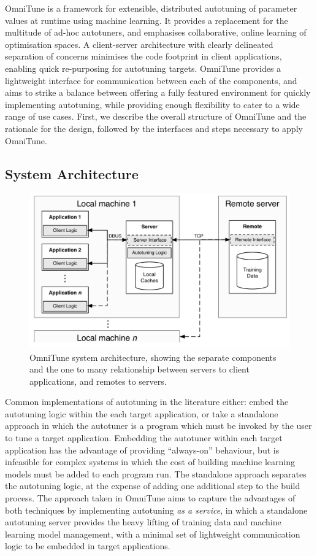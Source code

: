 \documentclass[nonatbib,preprint,9pt]{sigplanconf}
\begin{document}
OmniTune is a framework for extensible, distributed autotuning of
parameter values at runtime using machine learning. It provides a
replacement for the multitude of ad-hoc autotuners, and emphasises
collaborative, online learning of optimisation spaces. A client-server
architecture with clearly delineated separation of concerns minimises
the code footprint in client applications, enabling quick re-purposing
for autotuning targets. OmniTune provides a lightweight interface for
communication between each of the components, and aims to strike a
balance between offering a fully featured environment for quickly
implementing autotuning, while providing enough flexibility to cater
to a wide range of use cases. First, we describe the overall structure
of OmniTune and the rationale for the design, followed by the
interfaces and steps necessary to apply OmniTune.


\subsection{System Architecture}

\begin{figure}
\centering
\includegraphics[width=.98\columnwidth]{img/omnitune-system-overview.pdf}
\caption[OmniTune system diagram]{%
  OmniTune system architecture, showing the separate components and
  the one to many relationship between servers to client applications,
  and remotes to servers.%
}
\label{fig:omnitune-system-overview}
\end{figure}

Common implementations of autotuning in the literature either: embed
the autotuning logic within the each target application, or take a
standalone approach in which the autotuner is a program which must be
invoked by the user to tune a target application. Embedding the
autotuner within each target application has the advantage of
providing ``always-on'' behaviour, but is infeasible for complex
systems in which the cost of building machine learning models must be
added to each program run. The standalone approach separates the
autotuning logic, at the expense of adding one additional step to the
build process. The approach taken in OmniTune aims to capture the
advantages of both techniques by implementing autotuning \emph{as a
  service}, in which a standalone autotuning server provides the heavy
lifting of training data and machine learning model management, with a
minimal set of lightweight communication logic to be embedded in
target applications.
\end{document}
